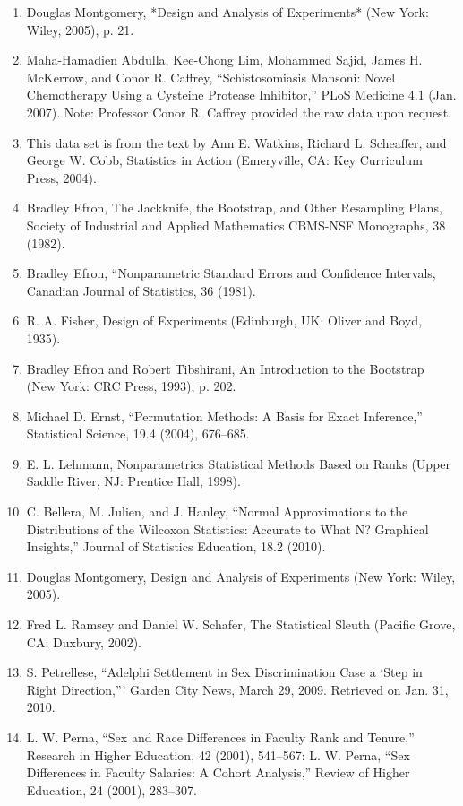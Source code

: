 \documentclass[
]{report}
\begin{document}
\begin{enumerate}

\item Douglas Montgomery, *Design and Analysis of Experiments* (New York: Wiley, 2005), p. 21.
\item Maha-Hamadien Abdulla, Kee-Chong Lim, Mohammed Sajid, James H. McKerrow, and Conor R. Caffrey, “Schistosomiasis Mansoni: Novel Chemotherapy Using a Cysteine Protease Inhibitor,” PLoS Medicine 4.1 (Jan. 2007). Note: Professor Conor R. Caffrey provided the raw data upon request.
\item This data set is from the text by Ann E. Watkins, Richard L. Scheaffer, and George W. Cobb, Statistics in Action (Emeryville, CA: Key Curriculum Press, 2004).
\item Bradley Efron, The Jackknife, the Bootstrap, and Other Resampling Plans, Society of Industrial and Applied Mathematics CBMS-NSF Monographs, 38 (1982).
\item Bradley Efron, “Nonparametric Standard Errors and Confidence Intervals, Canadian Journal of Statistics, 36 (1981).
\item R. A. Fisher, Design of Experiments (Edinburgh, UK: Oliver and Boyd, 1935).
\item Bradley Efron and Robert Tibshirani, An Introduction to the Bootstrap (New York: CRC Press, 1993), p. 202.
\item Michael D. Ernst, “Permutation Methods: A Basis for Exact Inference,” Statistical Science, 19.4 (2004), 676–685.
\item E. L. Lehmann, Nonparametrics Statistical Methods Based on Ranks (Upper Saddle River, NJ: Prentice Hall, 1998).
\item C. Bellera, M. Julien, and J. Hanley, “Normal Approximations to the Distributions of the Wilcoxon Statistics: Accurate
to What N? Graphical Insights,” Journal of Statistics Education, 18.2 (2010).
\item Douglas Montgomery, Design and Analysis of Experiments (New York: Wiley, 2005).
\item Fred L. Ramsey and Daniel W. Schafer, The Statistical Sleuth (Pacific Grove, CA: Duxbury, 2002).
\item S. Petrellese, “Adelphi Settlement in Sex Discrimination Case a ‘Step in Right Direction,”’ Garden City News, March 29, 2009. Retrieved on Jan. 31, 2010.
\item L. W. Perna, “Sex and Race Differences in Faculty Rank and Tenure,” Research in Higher Education, 42 (2001), 541–567: L. W. Perna, “Sex Differences in Faculty Salaries: A Cohort Analysis,” Review of Higher Education, 24 (2001), 283–307.

\end{enumerate}
\end{document}
